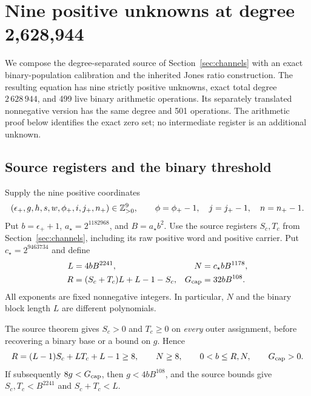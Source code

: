\section{Nine positive unknowns at degree 2,628,944}\label{sec:nine}

We compose the degree-separated source of Section~\ref{sec:channels} with
an exact binary-population calibration and the inherited Jones ratio
construction. The resulting equation has nine strictly positive unknowns,
exact total degree $2\,628\,944$, and 499 live binary arithmetic operations.
Its separately translated nonnegative version has the same degree and
501 operations. The arithmetic proof below identifies the exact zero set;
no intermediate register is an additional unknown.

\subsection{Source registers and the binary threshold}
Supply the nine positive coordinates
\[
 (\epsilon_+,g,h,s,w,\phi_+,i,j_+,n_+)\in\mathbb Z_{>0}^9,
 \qquad \phi=\phi_+-1,\quad j=j_+-1,\quad n=n_+-1.
\]
Put $b=\epsilon_++1$, $a_\star=2^{1182968}$, and $B=a_\star b^2$.
Use the source registers $S_c,T_c$ from Section~\ref{sec:channels},
including its raw positive word and positive carrier.
Put $c_\star=2^{9463734}$ and define
\begin{equation}\label{eq:nine-source}
\begin{aligned}
 L&=4bB^{2241},& N&=c_\star bB^{1178},\\
 R&=(S_c+T_c)L+L-1-S_c,& G_{\rm cap}&=32bB^{108}.
\end{aligned}
\end{equation}
All exponents are fixed nonnegative integers. In particular, $N$ and the
binary block length $L$ are different polynomials.

The source theorem gives $S_c>0$ and $T_c\geq0$ on \emph{every} outer
assignment, before recovering a binary base or a bound on $g$. Hence
\[
 R=(L-1)S_c+LT_c+L-1\geq8,
 \qquad N\geq8,\qquad 0<b\leq R,N,\qquad G_{\rm cap}>0.
\]
If subsequently $8g<G_{\rm cap}$, then $g<4bB^{108}$, and the source
bounds give $S_c,T_c<B^{2241}$ and $S_c+T_c<L$.

